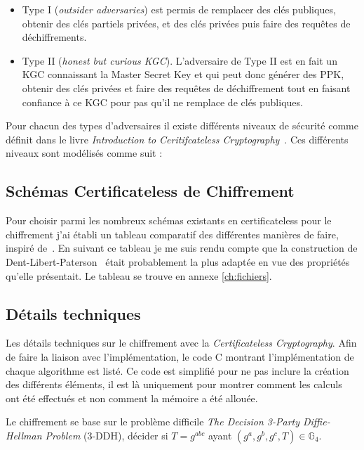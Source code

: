 \begin{itemize}
	\item Type I (\textit{outsider adversaries}) est permis de remplacer des clés publiques, obtenir des clés partiels privées, et des clés privées puis faire des requêtes de déchiffrements.
	\item Type II (\textit{honest but curious KGC}). L'adversaire de Type II est en fait un KGC connaissant la Master Secret Key et qui peut donc générer des PPK, obtenir des clés privées et faire des requêtes de déchiffrement tout en faisant confiance à ce KGC pour pas qu'il ne remplace de clés publiques.
\end{itemize}

Pour chacun des types d'adversaires il existe différents niveaux de sécurité comme définit dans le livre \textit{Introduction to Ceritifcateless Cryptography}~\cite{bookIntroCertificateless}. Ces différents niveaux sont modélisés comme suit :

\subsection{Schémas Certificateless de Chiffrement}
Pour choisir parmi les nombreux schémas existants en certificateless pour le chiffrement j'ai établi un tableau comparatif des différentes manières de faire, inspiré de~\cite{bookIntroCertificateless}. En suivant ce tableau je me suis rendu compte que la construction de Dent-Libert-Paterson~\cite{DBLP:conf/pkc/DentLP08} était probablement la plus adaptée en vue des propriétés qu'elle présentait. Le tableau se trouve en annexe \ref{ch:fichiers}.

\subsection{Détails techniques}
Les détails techniques sur le chiffrement avec la \textit{Certificateless Cryptography}. Afin de faire la liaison avec l'implémentation, le code C montrant l'implémentation de chaque algorithme est listé. Ce code est simplifié pour ne pas inclure la création des différents éléments, il est là uniquement pour montrer comment les calculs ont été effectués et non comment la mémoire a été allouée.

Le chiffrement se base sur le problème difficile \textit{The Decision 3-Party Diffie-Hellman Problem} (3-DDH), décider si $T =g^{abc}$ ayant $(g^a, g^b, g^c, T) \in \mathbb{G}_4$.

